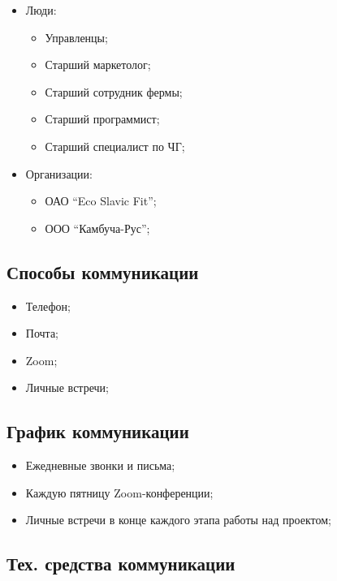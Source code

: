 \documentclass[a4paper,10pt]{article}
\begin{document}
    \begin{itemize}
    \item Люди:
        \begin{itemize}
            \item Управленцы;
            \item Старший маркетолог;
            \item Старший сотрудник фермы;
            \item Старший программист;
            \item Старший специалист по ЧГ;
        \end{itemize}
    \item Организации:
        \begin{itemize}
            \item ОАО ``Eco Slavic Fit'';
            \item ООО ``Камбуча-Рус'';
        \end{itemize}
    \end{itemize}

\subsection{Способы коммуникации}

    \begin{itemize}
        \item Телефон;
        \item Почта;
        \item Zoom;
        \item Личные встречи;
    \end{itemize}

\subsection{График коммуникации}

    \begin{itemize}
        \item Ежедневные звонки и письма;
        \item Каждую пятницу Zoom-конференции;
        \item Личные встречи в конце каждого этапа работы над проектом;
    \end{itemize}

\subsection{Тех. средства коммуникации}
\end{document}
